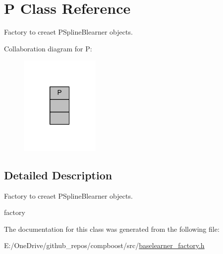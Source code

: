 \hypertarget{class_p}{}\section{P Class Reference}
\label{class_p}


Factory to creaet {\ttfamily P\+Spline\+Blearner} objects.  




Collaboration diagram for P\+:\nopagebreak
\begin{figure}[H]
\begin{center}
\leavevmode
\includegraphics[width=109pt]{class_p__coll__graph}
\end{center}
\end{figure}


\subsection{Detailed Description}
Factory to creaet {\ttfamily P\+Spline\+Blearner} objects. 

factory 

The documentation for this class was generated from the following file\+:\begin{DoxyCompactItemize}
\item 
E\+:/\+One\+Drive/github\+\_\+repos/compboost/src/\mbox{\hyperlink{baselearner__factory_8h}{baselearner\+\_\+factory.\+h}}\end{DoxyCompactItemize}
